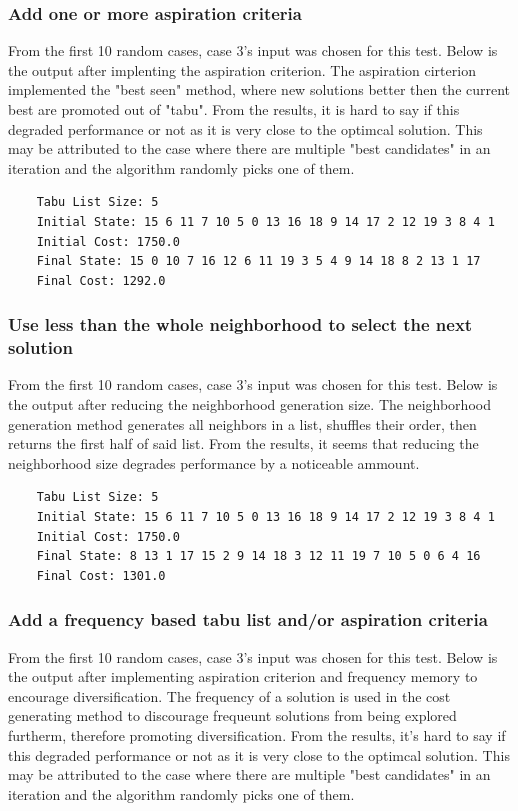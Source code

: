 \documentclass{article}
\begin{document}
\subsubsection{Add one or more aspiration criteria}

From the first 10 random cases, case 3's input was chosen for this test.
Below is the output after implenting the aspiration criterion.
The aspiration cirterion implemented the "best seen" method, where new solutions better then the current best are promoted out of "tabu".
From the results, it is hard to say if this degraded performance or not as it is very close to the optimcal solution.
This may be attributed to the case where there are multiple "best candidates" in an iteration and the algorithm randomly picks one of them.

\begin{lstlisting}
    Tabu List Size: 5
    Initial State: 15 6 11 7 10 5 0 13 16 18 9 14 17 2 12 19 3 8 4 1
    Initial Cost: 1750.0
    Final State: 15 0 10 7 16 12 6 11 19 3 5 4 9 14 18 8 2 13 1 17
    Final Cost: 1292.0    
\end{lstlisting}

\subsubsection{Use less than the whole neighborhood to select the next solution}

From the first 10 random cases, case 3's input was chosen for this test.
Below is the output after reducing the neighborhood generation size.
The neighborhood generation method generates all neighbors in a list, shuffles their order, then returns the first half of said list.
From the results, it seems that reducing the neighborhood size degrades performance by a noticeable ammount.

\begin{lstlisting}
    Tabu List Size: 5
    Initial State: 15 6 11 7 10 5 0 13 16 18 9 14 17 2 12 19 3 8 4 1
    Initial Cost: 1750.0
    Final State: 8 13 1 17 15 2 9 14 18 3 12 11 19 7 10 5 0 6 4 16
    Final Cost: 1301.0       
\end{lstlisting}

\subsubsection{Add a frequency based tabu list and/or aspiration criteria }

From the first 10 random cases, case 3's input was chosen for this test.
Below is the output after implementing aspiration criterion and frequency memory to encourage diversification.
The frequency of a solution is used in the cost generating method to discourage frequeunt solutions from being explored furtherm, therefore promoting diversification.
From the results, it's hard to say if this degraded performance or not as it is very close to the optimcal solution.
This may be attributed to the case where there are multiple "best candidates" in an iteration and the algorithm randomly picks one of them.
\end{document}
